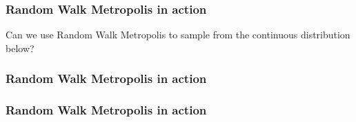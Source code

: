 \documentclass[handout]{beamer}
\begin{document}
\begin{frame}
\frametitle{Random Walk Metropolis in action}
Can we use Random Walk Metropolis to sample from the continuous distribution below?
\end{frame}

\begin{frame}
\frametitle{Random Walk Metropolis in action}
\begin{figure}[t]
\centerline{}
\end{figure}

\end{frame}

\begin{frame}
\frametitle{Random Walk Metropolis in action}

\begin{figure}[t]
\centerline{}
\end{figure}

\end{frame}
\end{document}
